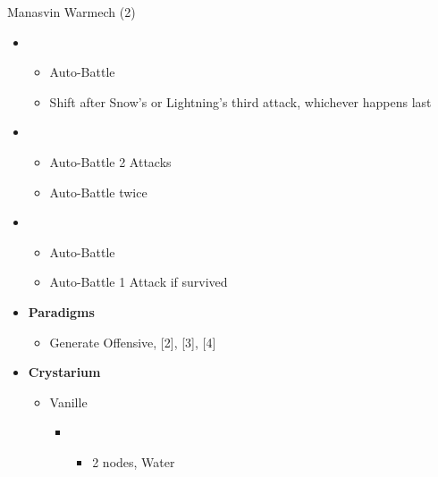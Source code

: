 \begin{battle}[0:50]{Manasvin Warmech (2)}
\begin{itemize}
\begin{itemize}
			      \end{itemize}
			\item \third
			      \begin{itemize}
				      \item Auto-Battle
				      \item Shift after Snow's or Lightning's third attack, whichever happens last
			      \end{itemize}
			\item \fourth
			      \begin{itemize}
				      \item Auto-Battle 2 Attacks
				      \item Auto-Battle twice
			      \end{itemize}
			\item \third
			      \begin{itemize}
				      \item Auto-Battle
				      \item Auto-Battle 1 Attack if survived
			      \end{itemize}
		\end{itemize}
	\end{battle}

	\begin{menu}
		\begin{itemize}
			\item \textbf{Paradigms}
			      \begin{itemize}
			      		\item Generate Offensive, [2], [3], [4]
			      \end{itemize}
			\item \textbf{Crystarium}
			      \begin{itemize}
				      \item Vanille
				            \begin{itemize}
					            \item \rav
					                  \begin{itemize}
						                  \item 2 nodes, Water
					                  \end{itemize}
				            \end{itemize}
			      \end{itemize}
		\end{itemize}
	\end{menu}

	\renewcommand{\first}{[1] Relentless Assault (\com/\rav/\rav)}
	\renewcommand{\second}{[2] Tri-Disaster (\rav/\rav/\rav)}
	\renewcommand{\third}{[3]  Relentless Assault (\com/\rav/\rav)}
	\renewcommand{\fourth}{[4] Tri-Disaster (\rav/\rav/\rav)}

